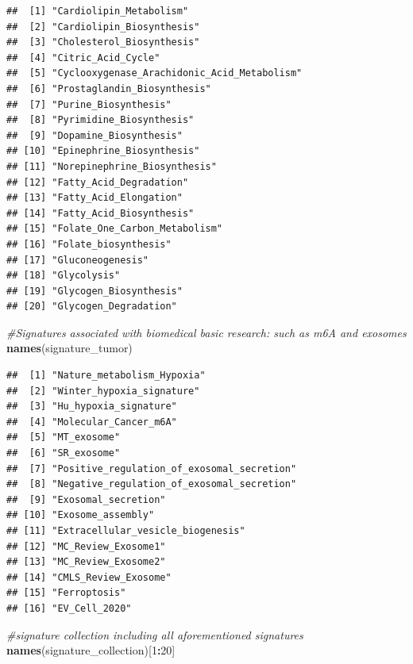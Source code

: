 \documentclass[
  12pt,
]{book}
\newenvironment{Shaded}{\begin{snugshade}}{\end{snugshade}}
\newcommand{\CommentTok}[1]{\textcolor[rgb]{0.56,0.35,0.01}{\textit{#1}}}
\newcommand{\DecValTok}[1]{\textcolor[rgb]{0.00,0.00,0.81}{#1}}
\newcommand{\FunctionTok}[1]{\textcolor[rgb]{0.13,0.29,0.53}{\textbf{#1}}}
\newcommand{\NormalTok}[1]{#1}
\newcommand{\SpecialCharTok}[1]{\textcolor[rgb]{0.81,0.36,0.00}{\textbf{#1}}}
\begin{document}
\begin{verbatim}
##  [1] "Cardiolipin_Metabolism"                    
##  [2] "Cardiolipin_Biosynthesis"                  
##  [3] "Cholesterol_Biosynthesis"                  
##  [4] "Citric_Acid_Cycle"                         
##  [5] "Cyclooxygenase_Arachidonic_Acid_Metabolism"
##  [6] "Prostaglandin_Biosynthesis"                
##  [7] "Purine_Biosynthesis"                       
##  [8] "Pyrimidine_Biosynthesis"                   
##  [9] "Dopamine_Biosynthesis"                     
## [10] "Epinephrine_Biosynthesis"                  
## [11] "Norepinephrine_Biosynthesis"               
## [12] "Fatty_Acid_Degradation"                    
## [13] "Fatty_Acid_Elongation"                     
## [14] "Fatty_Acid_Biosynthesis"                   
## [15] "Folate_One_Carbon_Metabolism"              
## [16] "Folate_biosynthesis"                       
## [17] "Gluconeogenesis"                           
## [18] "Glycolysis"                                
## [19] "Glycogen_Biosynthesis"                     
## [20] "Glycogen_Degradation"
\end{verbatim}

\begin{Shaded}
\begin{Highlighting}[]
\CommentTok{\#Signatures associated with biomedical basic research: such as m6A and exosomes}
\FunctionTok{names}\NormalTok{(signature\_tumor)}
\end{Highlighting}
\end{Shaded}

\begin{verbatim}
##  [1] "Nature_metabolism_Hypoxia"                
##  [2] "Winter_hypoxia_signature"                 
##  [3] "Hu_hypoxia_signature"                     
##  [4] "Molecular_Cancer_m6A"                     
##  [5] "MT_exosome"                               
##  [6] "SR_exosome"                               
##  [7] "Positive_regulation_of_exosomal_secretion"
##  [8] "Negative_regulation_of_exosomal_secretion"
##  [9] "Exosomal_secretion"                       
## [10] "Exosome_assembly"                         
## [11] "Extracellular_vesicle_biogenesis"         
## [12] "MC_Review_Exosome1"                       
## [13] "MC_Review_Exosome2"                       
## [14] "CMLS_Review_Exosome"                      
## [15] "Ferroptosis"                              
## [16] "EV_Cell_2020"
\end{verbatim}

\begin{Shaded}
\begin{Highlighting}[]
\CommentTok{\#signature collection including all aforementioned signatures }
\FunctionTok{names}\NormalTok{(signature\_collection)[}\DecValTok{1}\SpecialCharTok{:}\DecValTok{20}\NormalTok{]}
\end{Highlighting}
\end{Shaded}
\end{document}
